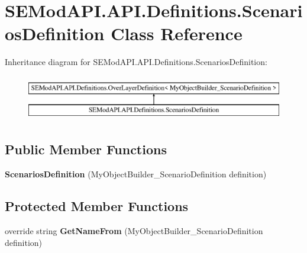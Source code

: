 \hypertarget{class_s_e_mod_a_p_i_1_1_a_p_i_1_1_definitions_1_1_scenarios_definition}{}\section{S\+E\+Mod\+A\+P\+I.\+A\+P\+I.\+Definitions.\+Scenarios\+Definition Class Reference}
\label{class_s_e_mod_a_p_i_1_1_a_p_i_1_1_definitions_1_1_scenarios_definition}
Inheritance diagram for S\+E\+Mod\+A\+P\+I.\+A\+P\+I.\+Definitions.\+Scenarios\+Definition\+:\begin{figure}[H]
\begin{center}
\leavevmode
\includegraphics[height=2.000000cm]{class_s_e_mod_a_p_i_1_1_a_p_i_1_1_definitions_1_1_scenarios_definition}
\end{center}
\end{figure}
\subsection*{Public Member Functions}
\begin{DoxyCompactItemize}
\item 
\hypertarget{class_s_e_mod_a_p_i_1_1_a_p_i_1_1_definitions_1_1_scenarios_definition_a72ae9f612850c00bd5a86ed3e479fd8b}{}{\bfseries Scenarios\+Definition} (My\+Object\+Builder\+\_\+\+Scenario\+Definition definition)\label{class_s_e_mod_a_p_i_1_1_a_p_i_1_1_definitions_1_1_scenarios_definition_a72ae9f612850c00bd5a86ed3e479fd8b}

\end{DoxyCompactItemize}
\subsection*{Protected Member Functions}
\begin{DoxyCompactItemize}
\item 
\hypertarget{class_s_e_mod_a_p_i_1_1_a_p_i_1_1_definitions_1_1_scenarios_definition_a507104f6772b412088e7e3955e2f3e1b}{}override string {\bfseries Get\+Name\+From} (My\+Object\+Builder\+\_\+\+Scenario\+Definition definition)\label{class_s_e_mod_a_p_i_1_1_a_p_i_1_1_definitions_1_1_scenarios_definition_a507104f6772b412088e7e3955e2f3e1b}

\end{DoxyCompactItemize}
